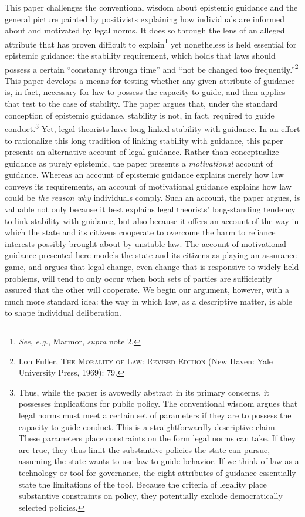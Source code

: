 This paper challenges the conventional wisdom about epistemic guidance
and the general picture painted by positivists explaining how
individuals are informed about and motivated by legal norms. It does so
through the lens of an alleged attribute that has proven difficult to
explain\footnote{\emph{See}, \emph{e.g.}, Marmor, \emph{supra} note 2.}
yet nonetheless is held essential for epistemic guidance: the stability
requirement, which holds that laws should possess a certain ``constancy
through time'' and ``not be changed too frequently.''\footnote{Lon
  Fuller, \textsc{The Morality of Law: Revised Edition} (New Haven: Yale
  University Press, 1969): 79.} This paper develops a means for testing
whether any given attribute of guidance is, in fact, necessary for law
to possess the capacity to guide, and then applies that test to the case
of stability. The paper argues that, under the standard conception of
epistemic guidance, stability is not, in fact, required to guide
conduct.\footnote{Thus, while the paper is avowedly abstract in its
  primary concerns, it possesses implications for public policy. The
  conventional wisdom argues that legal norms must meet a certain set of
  parameters if they are to possess the capacity to guide conduct. This
  is a straightforwardly descriptive claim. These parameters place
  constraints on the form legal norms can take. If they are true, they
  thus limit the substantive policies the state can pursue, assuming the
  state wants to use law to guide behavior. If we think of law as a
  technology or tool for governance, the eight attributes of guidance
  essentially state the limitations of the tool. Because the criteria of
  legality place substantive constraints on policy, they potentially
  exclude democratically selected policies.} Yet, legal theorists have
long linked stability with guidance. In an effort to rationalize this
long tradition of linking stability with guidance, this paper presents
an alternative account of legal guidance. Rather than conceptualize
guidance as purely epistemic, the paper presents a \emph{motivational}
account of guidance. Whereas an account of epistemic guidance explains
merely how law conveys its requirements, an account of motivational
guidance explains how law could be \emph{the reason why} individuals
comply. Such an account, the paper argues, is valuable not only because
it best explains legal theorists' long-standing tendency to link
stability with guidance, but also because it offers an account of the
way in which the state and its citizens cooperate to overcome the harm
to reliance interests possibly brought about by unstable law. The
account of motivational guidance presented here models the state and its
citizens as playing an assurance game, and argues that legal change,
even change that is responsive to widely-held problems, will tend to
only occur when both sets of parties are sufficiently assured that the
other will cooperate. We begin our argument, however, with a much more
standard idea: the way in which law, as a descriptive matter, is able to
shape individual deliberation.

